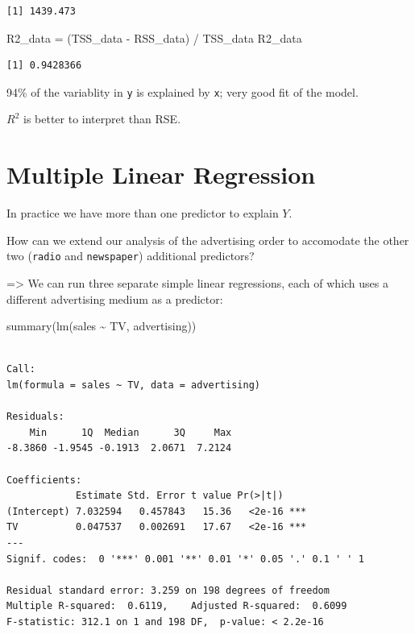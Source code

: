 \documentclass[
  letterpaper,
  DIV=11,
  numbers=noendperiod]{scrreprt}
\newenvironment{Shaded}{\begin{snugshade}}{\end{snugshade}}
\newcommand{\FunctionTok}[1]{\textcolor[rgb]{0.02,0.16,0.49}{#1}}
\newcommand{\NormalTok}[1]{\textcolor[rgb]{0.33,0.33,0.33}{#1}}
\newcommand{\OtherTok}[1]{\textcolor[rgb]{0.85,0.12,0.09}{#1}}
\newcommand{\SpecialCharTok}[1]{\textcolor[rgb]{0.00,0.46,0.62}{#1}}
\begin{document}
\begin{verbatim}
[1] 1439.473
\end{verbatim}

\begin{Shaded}
\begin{Highlighting}[]
\NormalTok{R2\_data }\OtherTok{=}\NormalTok{ (TSS\_data }\SpecialCharTok{{-}}\NormalTok{ RSS\_data) }\SpecialCharTok{/}\NormalTok{ TSS\_data}
\NormalTok{R2\_data}
\end{Highlighting}
\end{Shaded}

\begin{verbatim}
[1] 0.9428366
\end{verbatim}

94\% of the variablity in \texttt{y} is explained by \texttt{x}; very
good fit of the model.

\(R^2\) is better to interpret than RSE.

\hypertarget{multiple-linear-regression}{%
\section{Multiple Linear Regression}\label{multiple-linear-regression}}

In practice we have more than one predictor to explain \(Y\).

How can we extend our analysis of the advertising order to accomodate
the other two (\texttt{radio} and \texttt{newspaper}) additional
predictors?

=\textgreater{} We can run three separate simple linear regressions,
each of which uses a different advertising medium as a predictor:

\begin{Shaded}
\begin{Highlighting}[]
\FunctionTok{summary}\NormalTok{(}\FunctionTok{lm}\NormalTok{(sales }\SpecialCharTok{\textasciitilde{}}\NormalTok{ TV, advertising))}
\end{Highlighting}
\end{Shaded}

\begin{verbatim}

Call:
lm(formula = sales ~ TV, data = advertising)

Residuals:
    Min      1Q  Median      3Q     Max 
-8.3860 -1.9545 -0.1913  2.0671  7.2124 

Coefficients:
            Estimate Std. Error t value Pr(>|t|)    
(Intercept) 7.032594   0.457843   15.36   <2e-16 ***
TV          0.047537   0.002691   17.67   <2e-16 ***
---
Signif. codes:  0 '***' 0.001 '**' 0.01 '*' 0.05 '.' 0.1 ' ' 1

Residual standard error: 3.259 on 198 degrees of freedom
Multiple R-squared:  0.6119,    Adjusted R-squared:  0.6099 
F-statistic: 312.1 on 1 and 198 DF,  p-value: < 2.2e-16
\end{verbatim}
\end{document}
